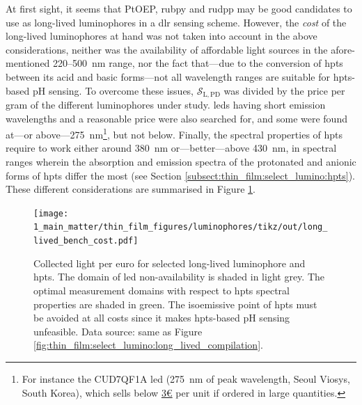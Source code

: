 At first sight, it seems that PtOEP, \gls{rubpy} and \gls{rudpp} may be good candidates to use as long-lived luminophores in a \gls{dlr} sensing scheme. However, the \emph{cost} of the long-lived luminophores at hand was not taken into account in the above considerations, neither was the availability of affordable light sources in the afore-mentioned 220--500~nm range, nor the fact that---due to the conversion of \gls{hpts} between its acid and basic forms---not all wavelength ranges are suitable for \gls{hpts}-based pH sensing. To overcome these issues, $\mathcal{S}_\mathrm{L,PD}$ was divided by the price per gram of the different luminophores under study. \glspl{led} having short emission wavelengths and a reasonable price were also searched for, and some were found at---or above---275~nm\footnote{For instance the CUD7QF1A \gls{led} (275~nm of peak wavelength, Seoul Viosys, South Korea), which sells below \href{https://web.archive.org/web/20220509144647/https://www.digikey.fr/fr/products/detail/seti-seoul-viosys/CUD7QF1A/9997656}{3\euro} per unit if ordered in large quantities.}, but not below. Finally, the spectral properties of \gls{hpts} require to work either around 380~nm or---better---above 430~nm, \ie{} in spectral ranges wherein the absorption and emission spectra of the protonated and anionic forms of \gls{hpts} differ the most (see Section \ref{subsect:thin_film:select_lumino:hpts}). These different considerations are summarised in Figure \ref{fig:thin_film:select_lumino:long_lived_bench_cost}.

\begin{figure}
	\centering
	\texttt{[image: 1\_main\_matter/thin\_film\_figures/luminophores/tikz/out/long\_lived\_bench\_cost.pdf]}
	\caption[Collected light per euro for selected long-lived luminophore and \gls{hpts}.]{Collected light per euro for selected long-lived luminophore and \gls{hpts}. The domain of \gls{led} non-availability is shaded in light grey. The optimal measurement domains with respect to \gls{hpts} spectral properties are shaded in green. The isoemissive point of \gls{hpts} must be avoided at all costs since it makes \gls{hpts}-based pH sensing unfeasible. Data source: same as Figure \ref{fig:thin_film:select_lumino:long_lived_compilation}.}
	\label{fig:thin_film:select_lumino:long_lived_bench_cost}
\end{figure}

